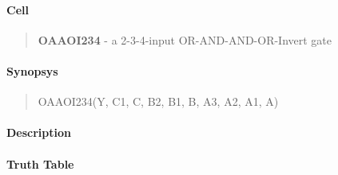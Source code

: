 \label{OAAOI234}
\paragraph{Cell}
\begin{quote}
    \textbf{OAAOI234} - a 2-3-4-input OR-AND-AND-OR-Invert gate
\end{quote}

\paragraph{Synopsys}
\begin{quote}
    OAAOI234(Y, C1, C, B2, B1, B, A3, A2, A1, A)
\end{quote}

\paragraph{Description}

%

\paragraph{Truth Table}
%


